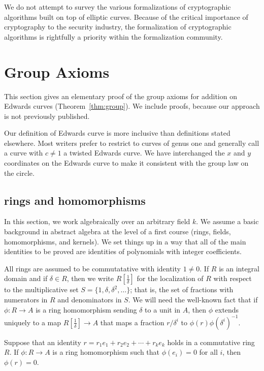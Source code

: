\documentclass{llncs}
\newcommand{\f}[1]{\frac{1}{#1}}
\begin{document}
We do not attempt to survey the various formalizations of
cryptographic algorithms built on top of elliptic curves.  Because of
the critical importance of cryptography to the security industry, the
formalization of cryptographic algorithms is rightfully a priority
within the formalization community.

\section{Group Axioms}\label{sec:axiom}

This section gives an elementary proof of the group axioms for
addition on Edwards curves (Theorem~\ref{thm:group}).  We include
proofs, because our approach is not previously published.  

Our definition of Edwards curve is more inclusive than definitions
stated elsewhere. Most writers prefer to restrict to curves of genus
one and generally call a curve with $c\ne 1$ a twisted Edwards
curve. We have interchanged the $x$ and $y$ coordinates on the Edwards
curve to make it consistent with the group law on the circle.



\subsection{rings and homomorphisms}

In this section, we work algebraically over an arbitrary field $k$.
We assume a basic background in abstract algebra at the level of
a first course (rings, fields, homomorphisms, and kernels).  We set
things up in a way that all of the main identities to be proved are
identities of polynomials with integer coefficients.

All rings are assumed to be commutatative with identity $1\ne0$.
If $R$ is an integral domain
and if $\delta\in R$, then we write $R[\f{\delta}]$ for
the localization of $R$ with respect to the multiplicative set
$S=\{1,\delta,\delta^2,\ldots\}$; that is, the set of 
fractions with numerators in $R$ and denominators in $S$.  We
will need the well-known fact that if $\phi:R\to A$ is a ring
homomorphism sending $\delta$ to a unit in $A$, then $\phi$ extends
uniquely to a map $R[\f{\delta}]\to A$ that maps a fraction
$r/\delta^i$ to $\phi(r)\phi(\delta^i)^{-1}$.

\begin{lemma} Suppose that an identity $r = r_1 e_1 +
  r_2 e_2 +\cdots + r_k e_k$ holds in a commutative ring $R$.  If $\phi:R\to A$ is
  a ring homomorphism such that $\phi(e_i) =0$ for all $i$, then
  $\phi(r)=0$.
\end{lemma}
\end{document}
